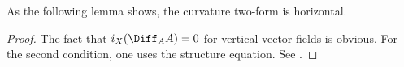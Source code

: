 As the following lemma shows, the curvature two-form is horizontal.

\begin{proof}
    The fact that \(i_X (\Diff_A A)=0\) for vertical vector fields is obvious. For the second condition, one uses the structure equation. See \parencite[Page 40]{Rudolph_2017pug}.
\end{proof}



